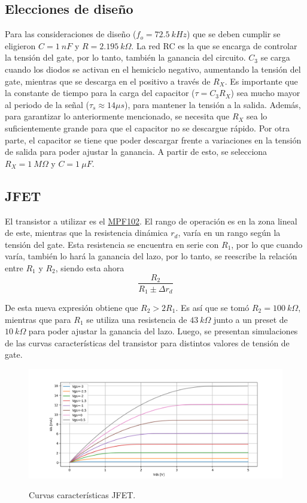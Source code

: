\subsection{Elecciones de diseño}
Para las consideraciones de diseño ($f_o = 72.5 \ kHz$) que se deben cumplir se eligieron $C = 1 \ nF$ y $ R =2.195 \ k\Omega$. La red RC es la que se encarga de controlar la tensión del gate, por lo tanto, también la ganancia del circuito. $C_3$ se carga cuando los diodos se activan en el hemiciclo negativo, aumentando la tensión del gate, mientras que se descarga en el positivo a través de $R_X$. Es importante que la constante de tiempo para la carga del capacitor ($\tau = C_3 R_X$) sea mucho mayor al periodo de la señal ($\tau_s \approx 14 \mu s$), para mantener la tensión a la salida. Además, para garantizar lo anteriormente mencionado, se necesita que $R_X$ sea lo suficientemente grande para que el capacitor no se descargue rápido. Por otra parte, el capacitor se tiene que poder descargar frente a variaciones en la
tensión de salida para poder ajustar la ganancia. A partir de esto, se selecciona $R_X = 1 \ M\Omega$ y $C = 1 \ \mu F$.

\subsection{JFET}
El transistor a utilizar es el \href{https://www.onsemi.com/pub/Collateral/MPF102-D.PDF}{MPF102}. El rango de operación es en la zona lineal de este, mientras que la resistencia dinámica $r_d$, varía en un rango según la tensión del gate. Esta resistencia se encuentra en serie con $R_1$, por lo que cuando varía, también lo hará la ganancia del lazo, por lo tanto, se reescribe la relación entre $R_1$ y $R_2$, siendo esta ahora
\begin{equation}
	\frac{R_2}{R_1 \pm \Delta r_d}
\end{equation}

De esta nueva expresión obtiene que $R_2>2 R_1$. Es así que se tomó $R_2 = 100 \ k\Omega$, mientras que para $R_1$ se utiliza una resistencia de $43 \ k\Omega$ junto a un preset de $10 \ k\Omega$ para poder ajustar la ganancia del lazo. Luego, se presentan simulaciones de las curvas características del transistor para distintos valores de tensión de gate.
\begin{figure}[H]
	\centering
	\includegraphics[width=\textwidth]{Imagenes-Ej1/curvasJfet.png}
	\label{fig:caracdcurv}
	\caption{Curvas características JFET.}
\end{figure}


